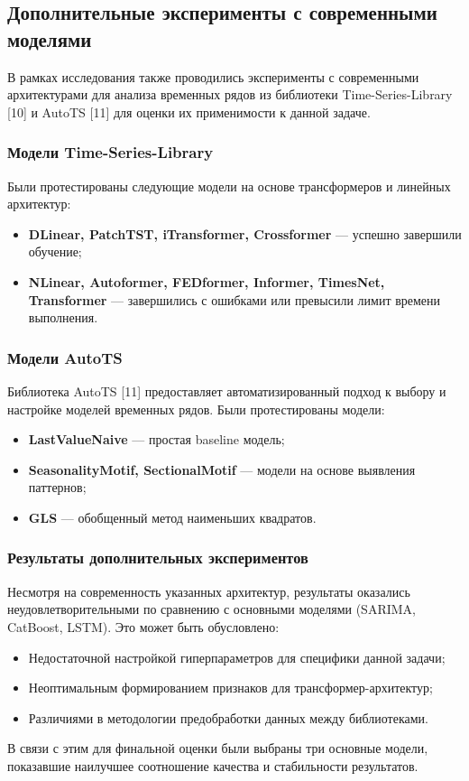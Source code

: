 \subsection{Дополнительные эксперименты с современными моделями}

\hspace*{1.25cm}В рамках исследования также проводились эксперименты с современными архитектурами для анализа временных рядов из библиотеки Time-Series-Library [10] и AutoTS [11] для оценки их применимости к данной задаче.

\subsubsection{Модели Time-Series-Library}

\hspace*{1.25cm}Были протестированы следующие модели на основе трансформеров и линейных архитектур:
\begin{itemize}
	\item \textbf{DLinear, PatchTST, iTransformer, Crossformer} --- успешно завершили обучение;
	\item \textbf{NLinear, Autoformer, FEDformer, Informer, TimesNet, Transformer} --- завершились с ошибками или превысили лимит времени выполнения.
\end{itemize}

\subsubsection{Модели AutoTS}

\hspace*{1.25cm}Библиотека AutoTS [11] предоставляет автоматизированный подход к выбору и настройке моделей временных рядов. Были протестированы модели:
\begin{itemize}
	\item \textbf{LastValueNaive} --- простая baseline модель;
	\item \textbf{SeasonalityMotif, SectionalMotif} --- модели на основе выявления паттернов;
	\item \textbf{GLS} --- обобщенный метод наименьших квадратов.
\end{itemize}

\subsubsection{Результаты дополнительных экспериментов}

\hspace*{1.25cm}Несмотря на современность указанных архитектур, результаты оказались неудовлетворительными по сравнению с основными моделями (SARIMA, CatBoost, LSTM). Это может быть обусловлено:
\begin{itemize}
	\item Недостаточной настройкой гиперпараметров для специфики данной задачи;
	\item Неоптимальным формированием признаков для трансформер-архитектур;
	\item Различиями в методологии предобработки данных между библиотеками.
\end{itemize}

\hspace*{1.25cm}В связи с этим для финальной оценки были выбраны три основные модели, показавшие наилучшее соотношение качества и стабильности результатов.